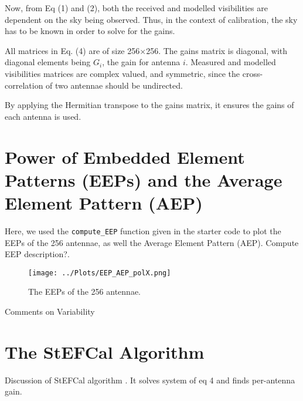 \documentclass[12pt]{report} %
\begin{document}
Now, from Eq (1) and (2), both the received and modelled visibilities are dependent on the sky being observed. Thus, in the context of calibration, the sky has to be known in order to solve for the gains.

All matrices in Eq. (4) are of size 256$\times$256. The gains matrix is diagonal, with diagonal elements being $G_{i}$, the gain for antenna $i$. Measured and modelled visibilities matrices are complex valued, and symmetric, since the cross-correlation of two antennae should be undirected.

By applying the Hermitian transpose to the gains matrix, it ensures the gains of each antenna is used.

\section{Power of Embedded Element Patterns (EEPs) and the Average Element Pattern (AEP)}

Here, we used the \texttt{compute\_EEP} function given in the starter code to plot the EEPs of the 256 antennae, as well the Average Element Pattern (AEP). Compute EEP description?.



\begin{figure}[h]
    \centering
    \texttt{[image: ../Plots/EEP\_AEP\_polX.png]}
    \caption{The EEPs of the 256 antennae.}
    \label{fig:EEPs}
\end{figure}

Comments on Variability


\section{The StEFCal Algorithm}

Discussion of StEFCal algorithm . It solves system of eq 4 and finds per-antenna gain.
\end{document}
